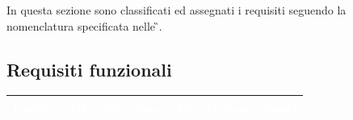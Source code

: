 In questa sezione sono classificati ed assegnati i requisiti seguendo la nomenclatura specificata nelle \NdP\G{}.

\subsection{Requisiti funzionali}

{
      \setlength{\freewidth}{\dimexpr\textwidth-10\tabcolsep}
      \renewcommand{\arraystretch}{1.5}
      \centering
      \setlength{\aboverulesep}{0pt}
      \setlength{\belowrulesep}{0pt}
      \begin{longtable}{C{.15\freewidth} C{.2\freewidth} C{.528\freewidth} C{.15\freewidth}}
         \toprule
      \textcolor{white}{\textbf{Codice}}&
      \textcolor{white}{\textbf{Classificazione}}&
      \textcolor{white}{\textbf{Descrizione}}&
      \textcolor{white}{\textbf{Fonti}}\\	
      \toprule
      \endhead
      

\end{longtable}}
